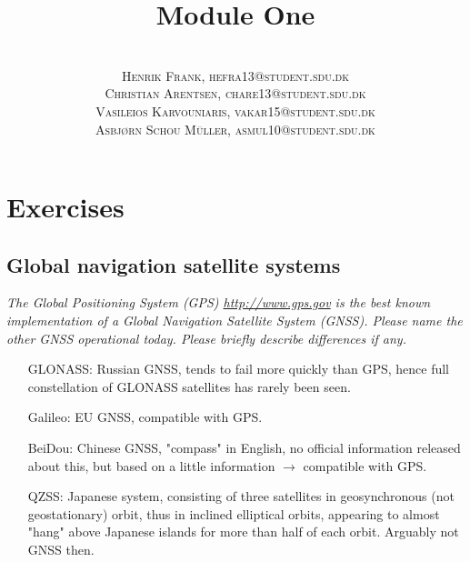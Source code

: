 \documentclass[paper=letter, fontsize=10pt]{article}
\title{\vspace{-15mm}\fontsize{24pt}{10pt}\selectfont\textbf{Module One }} %
\author{
\large
{\textsc{}}\\[2mm]
{\textsc{Henrik Frank, hefra13@student.sdu.dk }}\\[2mm]
{\textsc{Christian Arentsen, chare13@student.sdu.dk }}\\[2mm]
{\textsc{Vasileios Karvouniaris, vakar15@student.sdu.dk }}\\[2mm]
{\textsc{Asbjørn Schou Müller, asmul10@student.sdu.dk }}\\[20mm]
}
\date{}
\begin{document}
\maketitle %
\thispagestyle{fancy} %


\section{Exercises}
\subsection{Global navigation satellite systems}
\emph{The Global Positioning System (GPS) \url{http://www.gps.gov} is the best known implementation of a Global Navigation Satellite System (GNSS). Please name the other GNSS operational today. Please briefly describe differences if any.}
\begin{itemize}
\item[GLONASS:] Russian GNSS, tends to fail more quickly than GPS, hence full constellation of GLONASS satellites has rarely been seen.  
\item[Galileo:] EU GNSS, compatible with GPS.
\item[BeiDou:] Chinese GNSS, "compass" in English, no official information released about this, but based on a little information $\rightarrow$ compatible with GPS.
\item[QZSS:] Japanese system, consisting of three satellites in geosynchronous (not geostationary) orbit, thus in inclined elliptical orbits, appearing to almost "hang" above Japanese islands for more than half of each orbit. Arguably not GNSS then.
\end{itemize}
\end{document}

